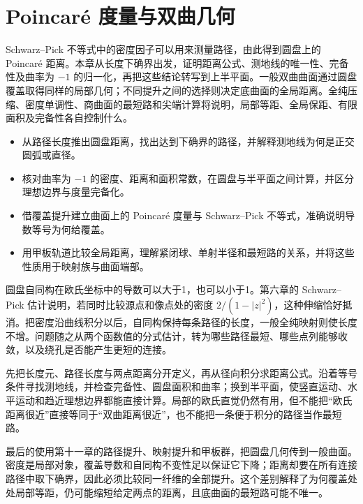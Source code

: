 \chapter{Poincaré 度量与双曲几何}
\label{b3:ch:13}
\begin{chapterabstract}
Schwarz--Pick 不等式中的密度因子可以用来测量路径，由此得到圆盘上的 Poincaré 距离。本章从长度下确界出发，证明距离公式、测地线的唯一性、完备性及曲率为 \(-1\) 的归一化，再把这些结论转写到上半平面。一般双曲曲面通过圆盘覆盖取得同样的局部几何；不同提升之间的选择则决定底曲面的全局距离。全纯压缩、密度单调性、商曲面的最短路和尖端计算将说明，局部等距、全局保距、有限面积及完备性各自控制什么。
\end{chapterabstract}

\begin{learninggoals}
\begin{itemize}
\item\label{b3:item:13-goal-1}从路径长度推出圆盘距离，找出达到下确界的路径，并解释测地线为何是正交圆弧或直径。
\item\label{b3:item:13-goal-2}核对曲率为 \(-1\) 的密度、距离和面积常数，在圆盘与半平面之间计算，并区分理想边界与度量完备化。
\item\label{b3:item:13-goal-3}借覆盖提升建立曲面上的 Poincaré 度量与 Schwarz--Pick 不等式，准确说明导数等号为何给覆盖。
\item\label{b3:item:13-goal-4}用甲板轨道比较全局距离，理解紧闭球、单射半径和最短路的关系，并将这些性质用于映射族与曲面端部。
\end{itemize}
\end{learninggoals}

圆盘自同构在欧氏坐标中的导数可以大于1，也可以小于1。第六章的 Schwarz--Pick 估计说明，若同时比较源点和像点处的密度 \(2/(1-|z|^2)\)，这种伸缩恰好抵消。把密度沿曲线积分以后，自同构保持每条路径的长度，一般全纯映射则使长度不增。问题随之从两个函数值的分式估计，转为哪些路径最短、哪些点列能够收敛，以及绕孔是否能产生更短的连接。

\ProseParagraphBreak
{}先把长度元、路径长度与两点距离分开定义，再从径向积分求距离公式。沿着等号条件寻找测地线，并检查完备性、圆盘面积和曲率；换到半平面，使竖直运动、水平运动和趋近理想边界都能直接计算。局部的欧氏直觉仍然有用，但不能把“欧氏距离很近”直接等同于“双曲距离很近”，也不能把一条便于积分的路径当作最短路。

\ProseParagraphBreak
最后的使用第十一章的路径提升、映射提升和甲板群，把圆盘几何传到一般曲面。密度是局部对象，覆盖导数和自同构不变性足以保证它下降；距离却要在所有连接路径中取下确界，因此必须比较同一纤维的全部提升。这个差别解释了为何覆盖处处局部等距，仍可能缩短给定两点的距离，且底曲面的最短路可能不唯一。

